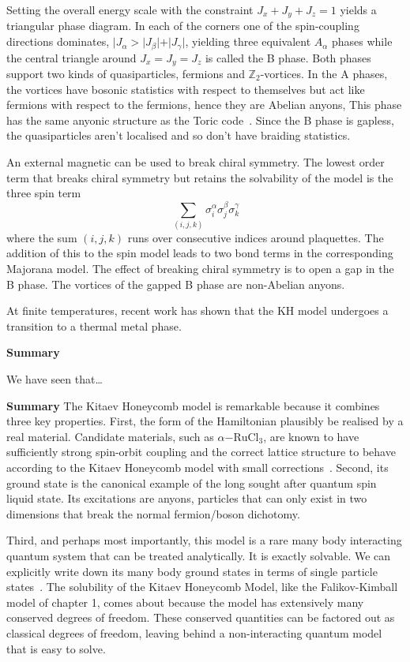Setting the overall energy scale with the constraint \(J_x + J_y + J_z = 1\) yields a triangular phase diagram. In each of the corners one of the spin-coupling directions dominates, \(|J_\alpha > |J_\beta| + |J_\gamma|\), yielding three equivalent \(A_\alpha\) phases while the central triangle around \(J_x = J_y = J_z\) is called the B phase. Both phases support two kinds of quasiparticles, fermions and \(\mathbb{Z}_2\)-vortices. In the A phases, the vortices have bosonic statistics with respect to themselves but act like fermions with respect to the fermions, hence they are Abelian anyons, This phase has the same anyonic structure as the Toric code~\autocite{kitaev_fault-tolerant_2003}. Since the B phase is gapless, the quasiparticles aren't localised and so don't have braiding statistics.

An external magnetic can be used to break chiral symmetry. The lowest order term that breaks chiral symmetry but retains the solvability of the model is the three spin term \[
\sum_{(i,j,k)} \sigma_i^{\alpha} \sigma_j^{\beta} \sigma_k^{\gamma}
\] where the sum \((i,j,k)\) runs over consecutive indices around plaquettes. The addition of this to the spin model leads to two bond terms in the corresponding Majorana model. The effect of breaking chiral symmetry is to open a gap in the B phase. The vortices of the gapped B phase are non-Abelian anyons.

At finite temperatures, recent work has shown that the KH model undergoes a transition to a thermal metal phase.

\textbf{Summary}

We have seen that\ldots{}

\textbf{Summary} The Kitaev Honeycomb model is remarkable because it combines three key properties. First, the form of the Hamiltonian plausibly be realised by a real material. Candidate materials, such as \(\alpha\mathrm{-RuCl}_3\), are known to have sufficiently strong spin-orbit coupling and the correct lattice structure to behave according to the Kitaev Honeycomb model with small corrections~\autocite{banerjeeProximateKitaevQuantum2016,TrebstPhysRep2022}. Second, its ground state is the canonical example of the long sought after quantum spin liquid state. Its excitations are anyons, particles that can only exist in two dimensions that break the normal fermion/boson dichotomy.

Third, and perhaps most importantly, this model is a rare many body interacting quantum system that can be treated analytically. It is exactly solvable. We can explicitly write down its many body ground states in terms of single particle states~\autocite{kitaevAnyonsExactlySolved2006}. The solubility of the Kitaev Honeycomb Model, like the Falikov-Kimball model of chapter 1, comes about because the model has extensively many conserved degrees of freedom. These conserved quantities can be factored out as classical degrees of freedom, leaving behind a non-interacting quantum model that is easy to solve.

